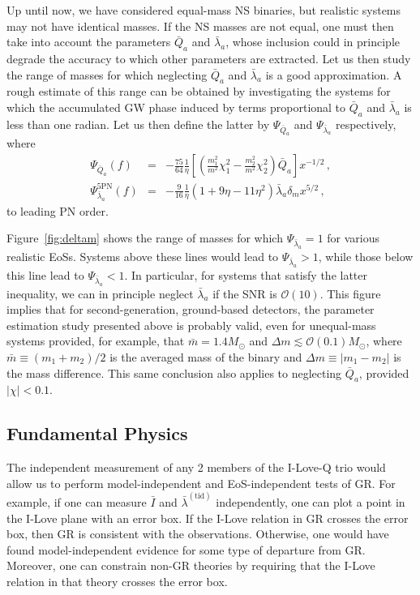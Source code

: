 \documentclass[aps,twocolumn,nofootinbib,showpacs,superscriptaddress,hyperref]{revtex4-1}
\newcommand\ba{\begin{eqnarray}}
\newcommand\ea{\end{eqnarray}}
\newcommand{\mrm}{\mathrm}
\newcommand{\lambdabartid}{\bar{\lambda}^\mathrm{(tid)}}
\newcommand{\Ibar}{\bar{I}}
\begin{document}
Up until now, we have considered equal-mass NS binaries, but realistic systems may not have identical masses. If the NS masses are not equal, one must then take into account the parameters $\bar{Q}_a$ and $\bar{\lambda}_a$, whose inclusion could in principle degrade the accuracy to which other parameters are extracted. Let us then study the range of masses for which neglecting $\bar{Q}_a$ and $\bar{\lambda}_a$ is a good approximation. A rough estimate of this range can be obtained by investigating the systems for which the accumulated GW phase induced by terms proportional to $\bar{Q}_a$ and $\bar{\lambda}_a$ is less than one radian. Let us then define the latter by $\Psi_{\bar{Q}_a}$ and $\Psi_{\bar{\lambda}_a}$ respectively, where 
%
\ba
\Psi_{\bar{Q}_a} (f) &=& - \frac{75}{64} \frac{1}{\eta} \left[ \left( \frac{m_1^2}{m^2} \chi_1^2 - \frac{m_2^2}{m^2} \chi_2^2 \right) \bar{Q}_a \right] x^{-1/2}\,, 
\nonumber \\
\Psi_{\bar{\lambda}_a}^\mrm{5PN} (f) &=&  -\frac{9}{16} \frac{1}{\eta} (1+9 \eta -11 \eta^2 ) \bar{\lambda}_a \delta_m  x^{5/2}\,,
\ea
%
to leading PN order. 

Figure~\ref{fig:deltam} shows the range of masses for which $\Psi_{\bar{\lambda}_a} = 1$ for various realistic EoSs. Systems above these lines would lead to  $\Psi_{\bar{\lambda}_a} > 1$, while those below this line lead to  $\Psi_{\bar{\lambda}_a} < 1$. In particular, for systems that satisfy the latter inequality, we can in principle neglect $\bar{\lambda}_a$ if the SNR is $\mathcal{O}(10)$. This figure implies that for second-generation, ground-based detectors, the parameter estimation study presented above is probably valid, even for unequal-mass systems provided, for example, that $\bar{m}=1.4 M_\odot$ and $\Delta m \lesssim \mathcal{O}(0.1)M_\odot$, where $\bar{m} \equiv (m_1 + m_2)/2$ is the averaged mass of the binary and $\Delta m \equiv |m_1 - m_2|$ is the mass difference. This same conclusion also applies to neglecting $\bar{Q}_{a}$, provided $|\chi| < 0.1$. 


\subsection{Fundamental Physics}

The independent measurement of any 2 members of the I-Love-Q trio would allow us to perform model-independent and EoS-independent tests of GR.  For example, if one can measure $\Ibar$ and $\lambdabartid$ independently, one can plot a point in the I-Love plane with an error box. If the I-Love relation in GR crosses the error box, then GR is consistent with the observations. Otherwise, one would have found model-independent evidence for some type of departure from GR. Moreover, one can constrain non-GR theories by requiring that the I-Love relation in that theory crosses the error box. 
\end{document}
